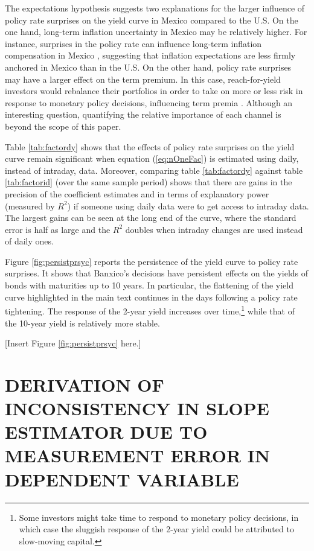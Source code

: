The expectations hypothesis suggests two explanations for the larger influence of policy rate surprises on the yield curve in Mexico compared to the U.S. On the one hand, long-term inflation uncertainty in Mexico may be relatively higher. For instance, surprises in the policy rate can influence long-term inflation compensation in Mexico \parencite[][table 9]{DePooter_etal:2014}, suggesting that inflation expectations are less firmly anchored in Mexico than in the U.S. On the other hand, policy rate surprises may have a larger effect on the term premium. In this case, reach-for-yield investors would rebalance their portfolios in order to take on more or less risk in response to monetary policy decisions, influencing term premia \parencite{HansonStein:2015}. Although an interesting question, quantifying the relative importance of each channel is beyond the scope of this paper.

Table \ref{tab:factordy} shows that the effects of policy rate surprises on the yield curve remain significant when equation (\ref{eq:nOneFac}) is estimated using daily, instead of intraday, data. Moreover, comparing table \ref{tab:factordy} against table \ref{tab:factorid} (over the same sample period) shows that there are gains in the precision of the coefficient estimates and in terms of explanatory power (measured by \(R^2\)) if someone using daily data were to get access to intraday data. The largest gains can be seen at the long end of the curve, where the standard error is half as large and the \(R^2\) doubles when intraday changes are used instead of daily ones. 

Figure \ref{fig:persistprsyc} reports the persistence of the yield curve to policy rate surprises. It shows that Banxico's decisions have persistent effects on the yields of bonds with maturities up to 10 years. In particular, the flattening of the yield curve highlighted in the main text continues in the days following a policy rate tightening. The response of the 2-year yield increases over time,\footnote{Some investors might take time to respond to monetary policy decisions, in which case the sluggish response of the 2-year yield could be attributed to slow-moving capital.} while that of the 10-year yield is relatively more stable.

%
\begin{center}
	[Insert Figure \ref{fig:persistprsyc} here.]
\end{center}

\sectitlespace
\section{DERIVATION OF INCONSISTENCY IN SLOPE ESTIMATOR DUE TO MEASUREMENT ERROR IN DEPENDENT VARIABLE} \label{sec:plim}
\sectitlespace

